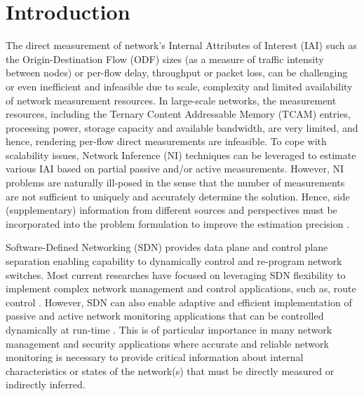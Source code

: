 \section{Introduction}  \label{sec:SNIPERIntro}
The direct measurement of network's Internal Attributes of Interest
(IAI) such as the Origin-Destination Flow (ODF) sizes (as a measure of
traffic intensity between nodes) or per-flow delay, throughput or
packet loss, can be challenging or even inefficient and infeasible due to
scale, complexity and limited availability of network measurement
resources. In large-scale networks, the measurement resources,
including the Ternary Content Addressable Memory (TCAM) entries,
processing power, storage capacity and available bandwidth,
are very limited, and hence, rendering per-flow direct measurements are
infeasible. To cope with scalability issues, Network Inference (NI)
techniques can be leveraged to estimate various IAI based on partial
passive and/or active measurements. However, NI problems are naturally
ill-posed in the sense that the number of measurements are not
sufficient to uniquely and accurately determine the solution. Hence,
side (supplementary) information from different sources and perspectives must be incorporated into the problem formulation to improve
the estimation precision \cite{QZhao:2006} \cite{MDFE:2013}
\cite{HNguyen:2007}.

Software-Defined Networking (SDN) provides data plane and control
plane separation enabling capability to dynamically control and
re-program network switches. Most current researches have focused on
leveraging SDN flexibility to implement complex network management and control
applications, such as, route control \cite{SDXGupta:2014}\cite{Rothenberg:2012}. However, SDN can also enable adaptive
and efficient implementation of passive and active network monitoring
applications that can be controlled dynamically at run-time
\cite{MYu:2011} \cite{MYu:2013} \cite{IF14iSTAMP:2014}
\cite{Adrichen:2014}. This is of particular importance in many network
management and security applications where accurate and reliable
network monitoring is necessary to provide critical information about
internal characteristics or states of the network(s) that must be
directly measured or indirectly inferred.


